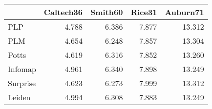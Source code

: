 \begin{tabular}{lrrrr}
\toprule
{} & Caltech36 & Smith60 & Rice31 & Auburn71 \\
\midrule
PLP      &     4.788 &   6.386 &  7.877 &   13.312 \\
PLM      &     4.654 &   6.248 &  7.857 &   13.304 \\
Potts    &     4.619 &   6.316 &  7.852 &   13.260 \\
Infomap  &     4.961 &   6.340 &  7.898 &   13.249 \\
Surprise &     4.623 &   6.273 &  7.999 &   13.312 \\
Leiden   &     4.994 &   6.308 &  7.883 &   13.249 \\
\bottomrule
\end{tabular}
